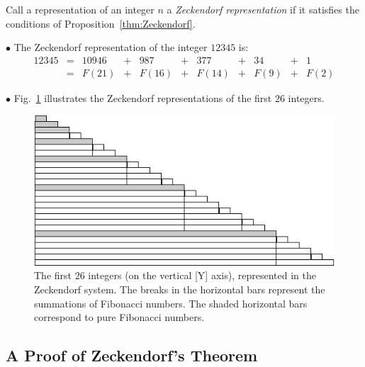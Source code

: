 \medskip


Call a representation of an integer $n$ a {\it Zeckendorf representation} if it satisfies the conditions of Proposition~\ref{thm:Zeckendorf}.

\medskip


\noindent $\bullet$
The Zeckendorf representation of the integer $12345$ is:
\[ \begin{array}{ccccccccccc}
12345 & =  & 10946 & + & 987    & +  &   377  & + & 34   & + & 1 \\
           & =  & F(21)  & + & F(16)  & +  & F(14) & + & F(9) & + & F(2)
\end{array} \]     

\medskip

\noindent $\bullet$
Fig.~\ref{fig:zeckendorf} illustrates the Zeckendorf representations of the first $26$ integers. 
\begin{figure}[h]
\begin{center}
        \includegraphics[scale=0.5]{FiguresArithmetic/Zeckendorf}
        \caption{The first $26$ integers (on the vertical [Y] axis), represented in the Zeckendorf system.  The breaks in the horizontal bars represent the summations of Fibonacci numbers.  The shaded horizontal bars correspond to pure Fibonacci numbers.}
\label{fig:zeckendorf}
\end{center}
\end{figure}

\subsection{A Proof of Zeckendorf's Theorem}
\label{sec:Zeckendorf-proof}

